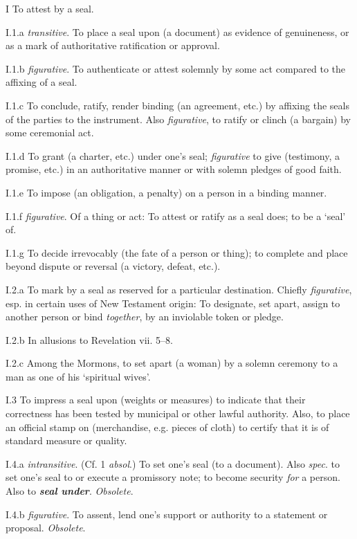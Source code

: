 	\begin{compactitem}
		\item[I] To attest by a seal.
		\item[I.1.a] \textit{transitive}. To place a seal upon (a document) as evidence of genuineness, or as a mark of authoritative ratification or approval.
		\item[I.1.b] \textit{figurative}. To authenticate or attest solemnly by some act compared to the affixing of a seal.
		\item[I.1.c] To conclude, ratify, render binding (an agreement, etc.) by affixing the seals of the parties to the instrument. Also \textit{figurative}, to ratify or clinch (a bargain) by some ceremonial act.
		\item[I.1.d] To grant (a charter, etc.) under one's seal; \textit{figurative} to give (testimony, a promise, etc.) in an authoritative manner or with solemn pledges of good faith.
		\item[I.1.e] To impose (an obligation, a penalty) on a person in a binding manner.
		\item[I.1.f] \textit{figurative}. Of a thing or act: To attest or ratify as a seal does; to be a `seal' of.
		\item[I.1.g] To decide irrevocably (the fate of a person or thing); to complete and place beyond dispute or reversal (a victory, defeat, etc.).
		\item[I.2.a] To mark by a seal as reserved for a particular destination. Chiefly \textit{figurative}, esp. in certain uses of New Testament origin: To designate, set apart, assign to another person or bind \textit{together}, by an inviolable token or pledge.
		\item[I.2.b] In allusions to Revelation vii. 5--8.
		\item[I.2.c] Among the Mormons, to set apart (a woman) by a solemn ceremony to a man as one of his `spiritual wives'.
		\item[I.3] To impress a seal upon (weights or measures) to indicate that their correctness has been tested by municipal or other lawful authority. Also, to place an official stamp on (merchandise, e.g. pieces of cloth) to certify that it is of standard measure or quality.
		\item[I.4.a] \textit{intransitive}. (Cf. 1 \textit{absol}.) To set one's seal (to a document). Also \textit{spec}. to set one's seal to or execute a promissory note; to become security \textit{for} a person. Also to \textbf{\textit{seal under}}. \textit{Obsolete}.
		\item[I.4.b] \textit{figurative}. To assent, lend one's support or authority to a statement or proposal. \textit{Obsolete}.

\end{compactitem}
